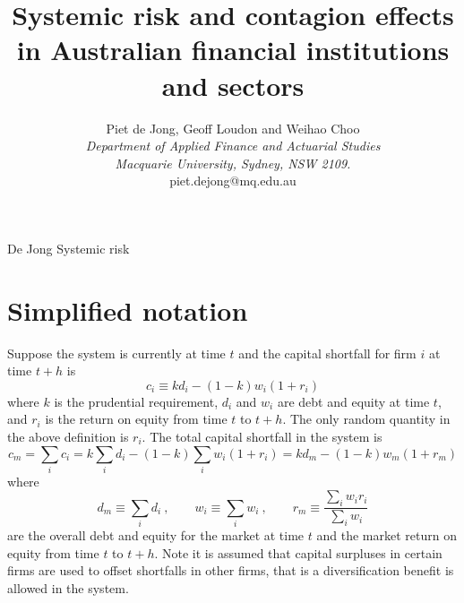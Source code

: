 \documentclass[authoryear]{elsarticle}
\newcommand{\cq}{\ , \qquad}
\begin{document}
\title{Systemic risk and contagion effects in Australian financial institutions and sectors}
\author{Piet de Jong,  Geoff Loudon and Weihao Choo \\[4pt]
\textit{Department of Applied Finance and Actuarial Studies\\ Macquarie University, Sydney, NSW 2109.}
\\[2pt]
{piet.dejong@mq.edu.au}}

\markboth%
{De Jong}
{Systemic risk}

\maketitle



\section{Simplified notation}

Suppose the system is currently at time $t$ and the capital shortfall for firm $i$ at time $t+h$ is
$$
c_i \equiv  kd_i -(1-k)w_i(1+r_i)
$$
where $k$ is the prudential requirement, $d_i$ and $w_i$ are debt and equity at time $t$, and $r_i$ is the return on equity from time $t$ to $t+h$. The only random quantity in the above definition is $r_i$. The total capital shortfall in the system is
$$
c_m = \sum_i c_i = k\sum_i d_i -(1-k)\sum_i w_i(1+r_i) = k d_m - (1-k)w_m(1+r_m) 
$$
where
$$
d_m \equiv \sum_i d_i \cq w_i \equiv \sum_i w_i \cq r_m \equiv \frac{\sum_i w_ir_i}{\sum_i w_i}
$$
are the overall debt and equity for the market at time $t$ and the market return on equity from time $t$ to $t+h$. Note it is assumed that capital surpluses in certain firms are used to offset shortfalls in other firms, that is a diversification benefit is allowed in the system.
\end{document}
